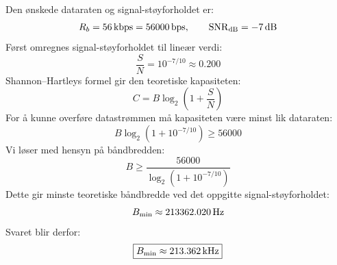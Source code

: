 Den ønskede dataraten og signal-støyforholdet er:
\[
    R_b=56\,\mathrm{kbps}=56000\,\mathrm{bps},
    \qquad \mathrm{SNR}_{\mathrm{dB}}=-7\,\mathrm{dB}
\]
Først omregnes signal-støyforholdet til lineær verdi:
\[
    \frac{S}{N}=10^{-7/10}\approx0.200
\]
Shannon--Hartleys formel gir den teoretiske kapasiteten:
\[
    C=B\log_2\!\left(1+\frac{S}{N}\right)
\]
For å kunne overføre datastrømmen må kapasiteten være minst lik dataraten:
\[
    B\log_2(1+10^{-7/10})\geq56000
\]
Vi løser med hensyn på båndbredden:
\[
    B\geq\frac{56000}{\log_2(1+10^{-7/10})}
\]
Dette gir minste teoretiske båndbredde ved det oppgitte signal-støyforholdet:
\[
    B_{\min}\approx213362.020\,\mathrm{Hz}
\]
Svaret blir derfor:
\[
    \boxed{B_{\min}\approx213.362\,\mathrm{kHz}}
\]
